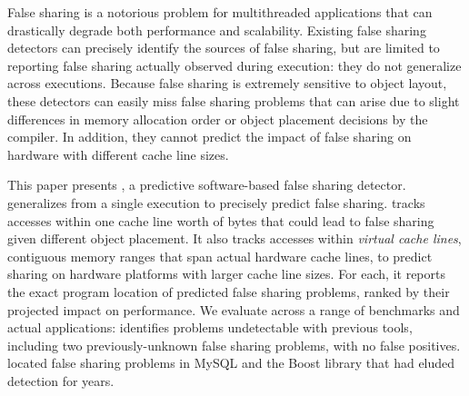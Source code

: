 

False sharing is a notorious problem for multithreaded applications
that can drastically degrade both performance and
scalability. Existing false sharing detectors can precisely identify
the sources of false sharing, but are limited to reporting false
sharing actually observed during execution: they do not generalize
across executions. Because false sharing is extremely sensitive to
object layout, these detectors can easily miss false sharing problems
that can arise due to slight differences in memory allocation order or
object placement decisions by the compiler. In addition, they cannot
predict the impact of false sharing on hardware with different cache
line sizes.


This paper presents \Predator{}, a predictive software-based false
sharing detector. \Predator{} generalizes from a single execution to
precisely predict false sharing. \predator{} tracks accesses within
one cache line worth of bytes that could lead to false sharing given
different object placement. It also tracks accesses within
\emph{virtual cache lines}, contiguous memory ranges that span actual
hardware cache lines, to predict sharing on hardware platforms with
larger cache line sizes. For each, it reports the exact program
location of predicted false sharing problems, ranked by their
projected impact on performance. We evaluate \Predator{} across a
range of benchmarks and actual applications: \Predator{} identifies
problems undetectable with previous tools, including two
previously-unknown false sharing problems, with no false
positives. \Predator{} located false sharing problems in MySQL and the
Boost library that had eluded detection for years.




